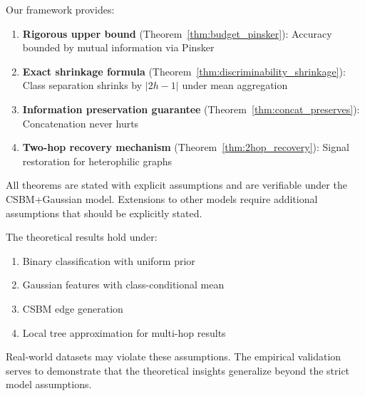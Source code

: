 Our framework provides:
\begin{enumerate}
    \item \textbf{Rigorous upper bound} (Theorem~\ref{thm:budget_pinsker}): Accuracy bounded by mutual information via Pinsker
    \item \textbf{Exact shrinkage formula} (Theorem~\ref{thm:discriminability_shrinkage}): Class separation shrinks by $|2h - 1|$ under mean aggregation
    \item \textbf{Information preservation guarantee} (Theorem~\ref{thm:concat_preserves}): Concatenation never hurts
    \item \textbf{Two-hop recovery mechanism} (Theorem~\ref{thm:2hop_recovery}): Signal restoration for heterophilic graphs
\end{enumerate}

All theorems are stated with explicit assumptions and are verifiable under the CSBM+Gaussian model. Extensions to other models require additional assumptions that should be explicitly stated.

\begin{remark}
\label{rem:scope}
The theoretical results hold under:
\begin{enumerate}
    \item Binary classification with uniform prior
    \item Gaussian features with class-conditional mean
    \item CSBM edge generation
    \item Local tree approximation for multi-hop results
\end{enumerate}
Real-world datasets may violate these assumptions. The empirical validation serves to demonstrate that the theoretical insights generalize beyond the strict model assumptions.
\end{remark}

